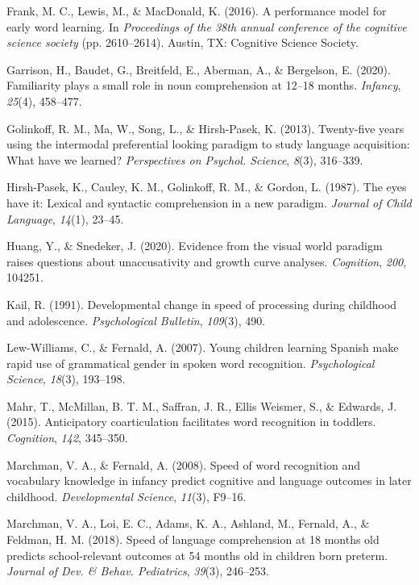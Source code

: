 \documentclass[10pt, letterpaper]{article}
\begin{document}
\leavevmode\hypertarget{ref-frank2016b}{}%
Frank, M. C., Lewis, M., \& MacDonald, K. (2016). A performance model
for early word learning. In \emph{Proceedings of the 38th annual
conference of the cognitive science society} (pp. 2610--2614). Austin,
TX: Cognitive Science Society.

\leavevmode\hypertarget{ref-Garrison2020}{}%
Garrison, H., Baudet, G., Breitfeld, E., Aberman, A., \& Bergelson, E.
(2020). Familiarity plays a small role in noun comprehension at 12--18
months. \emph{Infancy}, \emph{25}(4), 458--477.

\leavevmode\hypertarget{ref-Golinkoff2013}{}%
Golinkoff, R. M., Ma, W., Song, L., \& Hirsh-Pasek, K. (2013).
Twenty-five years using the intermodal preferential looking paradigm to
study language acquisition: What have we learned? \emph{Perspectives on
Psychol. Science}, \emph{8}(3), 316--339.

\leavevmode\hypertarget{ref-Hirsh-Pasek1987}{}%
Hirsh-Pasek, K., Cauley, K. M., Golinkoff, R. M., \& Gordon, L. (1987).
The eyes have it: Lexical and syntactic comprehension in a new paradigm.
\emph{Journal of Child Language}, \emph{14}(1), 23--45.

\leavevmode\hypertarget{ref-Huang2020}{}%
Huang, Y., \& Snedeker, J. (2020). Evidence from the visual world
paradigm raises questions about unaccusativity and growth curve
analyses. \emph{Cognition}, \emph{200}, 104251.

\leavevmode\hypertarget{ref-kail1991}{}%
Kail, R. (1991). Developmental change in speed of processing during
childhood and adolescence. \emph{Psychological Bulletin}, \emph{109}(3),
490.

\leavevmode\hypertarget{ref-Lew-Williams2007}{}%
Lew-Williams, C., \& Fernald, A. (2007). Young children learning Spanish
make rapid use of grammatical gender in spoken word recognition.
\emph{Psychological Science}, \emph{18}(3), 193--198.

\leavevmode\hypertarget{ref-Mahr2015}{}%
Mahr, T., McMillan, B. T. M., Saffran, J. R., Ellis Weismer, S., \&
Edwards, J. (2015). Anticipatory coarticulation facilitates word
recognition in toddlers. \emph{Cognition}, \emph{142}, 345--350.

\leavevmode\hypertarget{ref-Marchman2008}{}%
Marchman, V. A., \& Fernald, A. (2008). Speed of word recognition and
vocabulary knowledge in infancy predict cognitive and language outcomes
in later childhood. \emph{Developmental Science}, \emph{11}(3), F9--16.

\leavevmode\hypertarget{ref-Marchman2018}{}%
Marchman, V. A., Loi, E. C., Adams, K. A., Ashland, M., Fernald, A., \&
Feldman, H. M. (2018). Speed of language comprehension at 18 months old
predicts school-relevant outcomes at 54 months old in children born
preterm. \emph{Journal of Dev. \& Behav. Pediatrics}, \emph{39}(3),
246--253.
\end{document}
